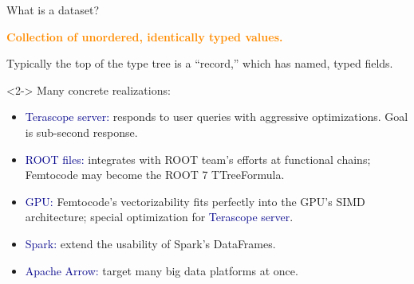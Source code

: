 \documentclass{beamer}
\begin{document}


\begin{frame}{What is a dataset?}
\vspace{0.25 cm}
\begin{center}
\begin{minipage}{0.9\linewidth}
\textcolor{darkorange}{\bf Collection of unordered, identically typed values.}

\vspace{0.25 cm}
Typically the top of the type tree is a ``record,'' which has named, typed fields.
\end{minipage}
\end{center}

\begin{uncoverenv}<2->
Many concrete realizations:
\begin{itemize}
\item \textcolor{darkblue}{Terascope server:} responds to user queries with aggressive optimizations. Goal is sub-second response.
\item \textcolor{darkblue}{ROOT files:} integrates with ROOT team's efforts at functional chains; Femtocode may become the ROOT 7 TTreeFormula.
\item \textcolor{darkblue}{GPU:} Femtocode's vectorizability fits perfectly into the GPU's SIMD architecture; special optimization for \textcolor{darkblue}{Terascope server}.
\item \textcolor{darkblue}{Spark:} extend the usability of Spark's DataFrames.
\item \textcolor{darkblue}{Apache Arrow:} target many big data platforms at once.
\end{itemize}
\end{uncoverenv}
\end{frame}
\end{document}
